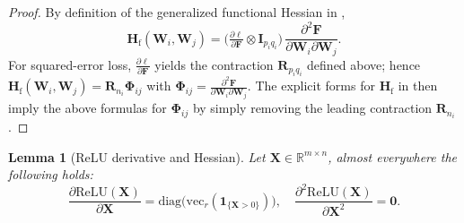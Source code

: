 \documentclass{article}
\newtheorem{lemma}{Lemma}
\begin{document}
\begin{proof}  
 By definition of the generalized functional Hessian in \cite{ormaniec2024attentionhessian},
\[
\mathbf{H}_{\mathrm{f}}(\mathbf{W}_i,\mathbf{W}_j)
= \big( \tfrac{\partial \ell}{\partial \mathbf{F}} \otimes \mathbf{I}_{p_i q_i} \big)\,
\frac{\partial^2 \mathbf{F}}{\partial \mathbf{W}_i \partial \mathbf{W}_j}.
\]
For squared-error loss, $\tfrac{\partial \ell}{\partial \mathbf{F}}$ yields the contraction $\mathbf{R}_{p_i q_i}$ defined above; hence
$\mathbf{H}_{\mathrm{f}}(\mathbf{W}_i,\mathbf{W}_j) = \mathbf{R}_{n_i} \boldsymbol{\Phi}_{ij}$
with $\boldsymbol{\Phi}_{ij} = \tfrac{\partial^2 \mathbf{F}}{\partial \mathbf{W}_i \partial \mathbf{W}_j}$.
The explicit forms for $\mathbf{H}_{\mathrm{f}}$ in \cite[Thm.~3.2]{ormaniec2024attentionhessian} then imply the above formulas for $\boldsymbol{\Phi}_{ij}$ by simply removing the leading contraction $\mathbf{R}_{n_i}$.
\end{proof}

\begin{lemma}[ReLU derivative and Hessian] \label{proof:relu_derivative_hessian}
Let $\mathbf{X} \in \mathbb{R}^{m \times n}$, almost everywhere the following holds:
\[ \frac{\partial \mathrm{ReLU}(\mathbf{X})}{\partial \mathbf{X}} = \mathrm{diag}\!\big(\mathrm{vec}_r(\mathbf{1}_{\{\mathbf{X}>0\}})\big), \quad \frac{\partial^2 \mathrm{ReLU}(\mathbf{X})}{\partial \mathbf{X}^2} = \mathbf{0}. \]
\end{lemma}
\end{document}
